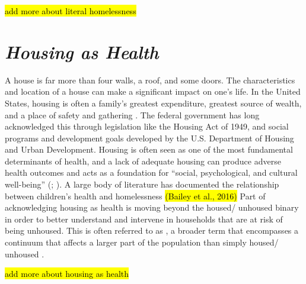 \hl{add more about literal homelessness}

\section{\textit{Housing as Health}}
A house is far more than four walls, a roof, and some doors. The characteristics and location of a house can make a significant impact on one’s life. In the United States, housing is often a family’s greatest expenditure, greatest source of wealth, and a place of safety and gathering \citep{braveman_housing_2011}. The federal government has long acknowledged this through legislation like the Housing Act of 1949, and social programs and development goals developed by the U.S. Department of Housing and Urban Development. Housing is often seen as one of the most fundamental determinants of health, and a lack of adequate housing can produce adverse health outcomes and acts as a foundation for “social, psychological, and cultural well-being” (\citealp[p.17]{dalessandro_housing_2020}; \citealp{leifheit_building_2022}). A large body of literature has documented the relationship between children's health and homelessness \hl{(Bailey et al., 2016)} Part of acknowledging housing as health is moving beyond the housed/ unhoused binary in order to better understand and intervene in households that are at risk of being unhoused. This is often referred to as \hs, a broader term that encompasses a continuum that affects a larger part of the population than simply housed/ unhoused \citep{deluca_housing_2022}.

\hl{add more about housing as health}


